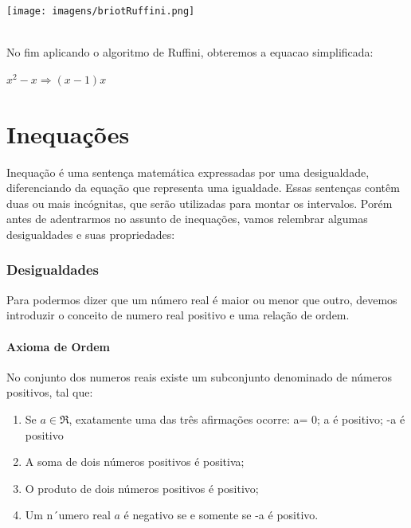 \documentclass[a4paper,12pt,twoside,BCOR=10mm]{scrbook}
\begin{document}
\begin{titlepage}
\begin{center}
\texttt{[image: imagens/briotRuffini.png]}
\end{center}
\\
No fim aplicando o algoritmo de Ruffini, obteremos a equacao simplificada:
\\
\begin{center}
$x^{2} - x \Rightarrow (x - 1)x$
\end{center}



\chapter{Inequações}
Inequação é uma sentença matemática expressadas por uma desigualdade, diferenciando da equação que representa uma igualdade. Essas sentenças contêm duas ou mais incógnitas, que serão utilizadas para montar os intervalos.
Porém antes de adentrarmos no assunto de inequações, vamos relembrar algumas desigualdades e suas propriedades:
\subsection{Desigualdades}
Para podermos dizer que um número real é maior ou menor que outro, devemos introduzir o conceito de numero real positivo e uma relação de ordem.
\\
\subsubsection{Axioma de Ordem}
No conjunto dos numeros reais existe um subconjunto denominado de números positivos, tal que:
\begin{enumerate}
\item Se $a \in \Re$, exatamente uma das três afirmações ocorre: a= 0; a é positivo; -a é positivo
\item A soma de dois números positivos é positiva;
\item O produto de dois números positivos é positivo;
\item Um n´umero real $a$ é negativo se e somente se -a é positivo.
\end{enumerate}

\end{titlepage}
\end{document}
